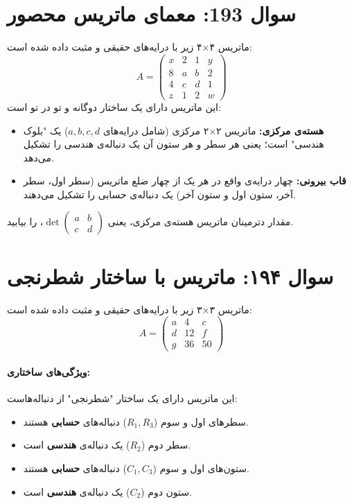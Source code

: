 \documentclass[12pt]{article}
\begin{document}
\section*{سوال 193: معمای ماتریس محصور}
ماتریس ۴×۴ زیر با درایه‌های حقیقی و مثبت داده شده است:
\[ A = \begin{pmatrix}
	x & 2 & 1 & y \\
	8 & a & b & 2 \\
	4 & c & d & 1 \\
	z & 1 & 2 & w
\end{pmatrix} \]
این ماتریس دارای یک ساختار دوگانه و تو در تو است:
\begin{itemize}
	\item \textbf{هسته‌ی مرکزی:} ماتریس ۲×۲ مرکزی (شامل درایه‌های \(a, b, c, d\)) یک "بلوک هندسی" است؛ یعنی هر سطر و هر ستون آن یک دنباله‌ی هندسی را تشکیل می‌دهد.
	\item \textbf{قاب بیرونی:} چهار درایه‌ی واقع در هر یک از چهار ضلع ماتریس (سطر اول، سطر آخر، ستون اول و ستون آخر) یک دنباله‌ی حسابی را تشکیل می‌دهند.
\end{itemize}
\vspace{0.5cm}
مقدار دترمینان ماتریس هسته‌ی مرکزی، یعنی \( \det \begin{pmatrix} a & b \\ c & d \end{pmatrix} \)، را بیابید.

\vspace{1cm}
\hrulefill
\vspace{1cm}
\section*{سوال ۱۹۴: ماتریس با ساختار شطرنجی}
ماتریس ۳×۳ زیر با درایه‌های حقیقی و مثبت داده شده است:
\[ A = \begin{pmatrix} a & 4 & c \\ d & 12 & f \\ g & 36 & 50 \end{pmatrix} \]

\paragraph{ویژگی‌های ساختاری:}
این ماتریس دارای یک ساختار "شطرنجی" از دنباله‌هاست:
\begin{itemize}
	\item سطرهای اول و سوم (\(R_1, R_3\)) دنباله‌های \textbf{حسابی} هستند.
	\item سطر دوم (\(R_2\)) یک دنباله‌ی \textbf{هندسی} است.
	\item ستون‌های اول و سوم (\(C_1, C_3\)) دنباله‌های \textbf{حسابی} هستند.
	\item ستون دوم (\(C_2\)) یک دنباله‌ی \textbf{هندسی} است.
\end{itemize}
\end{document}
